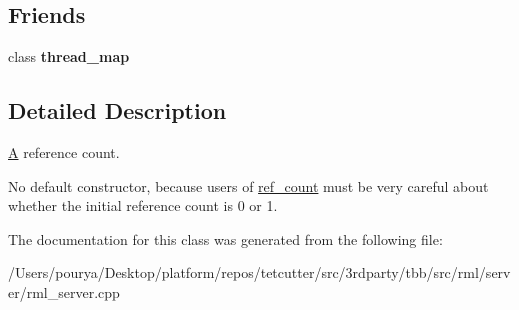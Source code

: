 \subsection*{Friends}
\begin{DoxyCompactItemize}
\item 
\hypertarget{classrml_1_1internal_1_1ref__count_aaaf376618c914d70fbb2419523962de3}{}class {\bfseries thread\+\_\+map}\label{classrml_1_1internal_1_1ref__count_aaaf376618c914d70fbb2419523962de3}

\end{DoxyCompactItemize}


\subsection{Detailed Description}
\hyperlink{structA}{A} reference count. 

No default constructor, because users of \hyperlink{classrml_1_1internal_1_1ref__count}{ref\+\_\+count} must be very careful about whether the initial reference count is 0 or 1. 

The documentation for this class was generated from the following file\+:\begin{DoxyCompactItemize}
\item 
/\+Users/pourya/\+Desktop/platform/repos/tetcutter/src/3rdparty/tbb/src/rml/server/rml\+\_\+server.\+cpp\end{DoxyCompactItemize}
